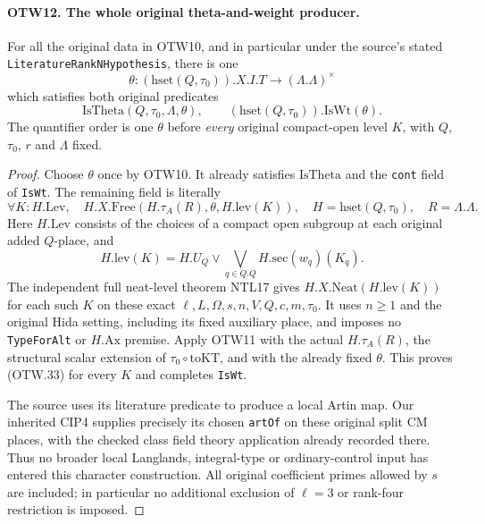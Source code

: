 \paragraph{OTW12. The whole original theta-and-weight producer.}
\label{claim:OTW12}
For all the original data in OTW10, and in particular under the
source's stated \texttt{LiteratureRankNHypothesis}, there is one
\[
        \theta:(\mathrm{hset}(Q,\tau_0)).X.I.T\to(\Lambda.\Lambda)^\times
        \tag{OTW.31}
\]
which satisfies both original predicates
\[
        \mathrm{IsTheta}(Q,\tau_0,\Lambda,\theta),
        \qquad (\mathrm{hset}(Q,\tau_0)).\mathrm{IsWt}(\theta).
        \tag{OTW.32}
\]
The quantifier order is one $\theta$ before \emph{every} original
compact-open level $K$, with $Q$, $\tau_0$, $r$ and $\Lambda$ fixed.
\begin{proof}
Choose $\theta$ once by OTW10.  It already satisfies
$\mathrm{IsTheta}$ and the \texttt{cont} field of \texttt{IsWt}.
The remaining field is literally
\[
 \forall K:H.\mathrm{Lev},\quad
           H.X.\mathrm{Free}(H.\tau_A(R),\theta,H.\mathrm{lev}(K)),
 \quad H=\mathrm{hset}(Q,\tau_0),\quad R=\Lambda.\Lambda.
 \tag{OTW.33}
\]
Here $H.\mathrm{Lev}$ consists of the choices of a compact open
subgroup at each original added $Q$-place, and
\[
             H.\mathrm{lev}(K)=H.U_Q\vee
                       \bigvee_{q\in Q.Q}H.\mathrm{sec}(w_q)(K_q).
             \tag{OTW.34}
\]
The independent full neat-level theorem NTL17 gives
$H.X.\mathrm{Neat}(H.\mathrm{lev}(K))$ for each such $K$ on
these exact $\ell,L,\Omega,s,n,V,Q,c,m,\tau_0$.
It uses $n\geq1$ and the original Hida setting, including its
fixed auxiliary place, and imposes no \texttt{TypeForAlt} or
$H.\mathrm{Ax}$ premise.  Apply OTW11 with the actual
$H.\tau_A(R)$, the structural scalar extension of
$\tau_0\circ\mathrm{toKT}$, and with the already fixed $\theta$.
This proves (OTW.33) for every $K$ and completes \texttt{IsWt}.

The source uses its literature predicate to produce a local Artin
map.  Our inherited CIP4 supplies precisely its chosen \texttt{artOf}
on these original split CM places, with the checked class field
theory application already recorded there.  Thus no broader local
Langlands, integral-type or ordinary-control input has entered this
character construction.  All original coefficient primes allowed
by $s$ are included; in particular no additional exclusion of
$\ell=3$ or rank-four restriction is imposed.
\end{proof}

